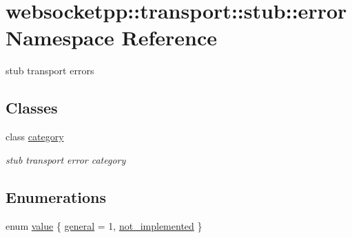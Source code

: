 \hypertarget{namespacewebsocketpp_1_1transport_1_1stub_1_1error}{}\section{websocketpp\+:\+:transport\+:\+:stub\+:\+:error Namespace Reference}
\label{namespacewebsocketpp_1_1transport_1_1stub_1_1error}


stub transport errors  


\subsection*{Classes}
\begin{DoxyCompactItemize}
\item 
class \mbox{\hyperlink{classwebsocketpp_1_1transport_1_1stub_1_1error_1_1category}{category}}
\begin{DoxyCompactList}\small\item\em stub transport error category \end{DoxyCompactList}\end{DoxyCompactItemize}
\subsection*{Enumerations}
\begin{DoxyCompactItemize}
\item 
enum \mbox{\hyperlink{namespacewebsocketpp_1_1transport_1_1stub_1_1error_abff42d9e608f90864af8d628f6932022}{value}} \{ \mbox{\hyperlink{namespacewebsocketpp_1_1transport_1_1stub_1_1error_abff42d9e608f90864af8d628f6932022a62b9c9a1d537b94775fc8a8db6ff942e}{general}} = 1, 
\mbox{\hyperlink{namespacewebsocketpp_1_1transport_1_1stub_1_1error_abff42d9e608f90864af8d628f6932022ac4e3eebdd5ac574285cde2df484f0aae}{not\+\_\+implemented}}
 \}
\end{DoxyCompactItemize}
